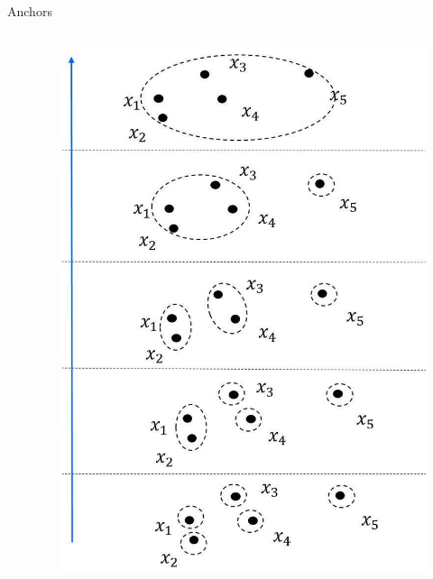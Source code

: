 \documentclass{beamer}
\begin{document}
\begin{frame}{Anchors}
\begin{columns}
\begin{column}{0.48\textwidth}
        \end{column}
        \begin{column}{0.4\textwidth}
            \begin{figure}[htpb]
                \begin{center}
                    \includegraphics[width=\linewidth]{./images/cluster.jpg}
                \end{center}
            \end{figure}
        \end{column}             
    \end{columns}
    
\end{frame}
\end{document}
